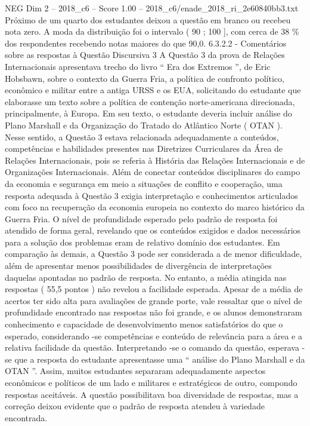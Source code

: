 \begin{textsample}{NEG Dim 2 – 2018\_c6 – Score 1.00 – 2018\_c6/enade\_2018\_ri\_2e60840bb3.txt}
Próximo de um quarto dos estudantes deixou a questão em branco ou recebeu nota zero.
A moda da distribuição foi o intervalo ( 90 ; 100 ], com cerca de 38 \% dos respondentes recebendo notas maiores do que 90,0. 6.3.2.2 - Comentários sobre as respostas à Questão Discursiva 3 A Questão 3 da prova de Relações Internacionais apresentava trecho do livro “ Era dos Extremos ”, de Eric Hobsbawn, sobre o contexto da Guerra Fria, a política de confronto político, econômico e militar entre a antiga URSS e os EUA, solicitando do estudante que elaborasse um texto sobre a política de contenção norte-americana direcionada, principalmente, à Europa.
Em seu texto, o estudante deveria incluir análise do Plano Marshall e da Organização do Tratado do Atlântico Norte ( OTAN ).
Nesse sentido, a Questão 3 estava relacionada adequadamente a conteúdos, competências e habilidades presentes nas Diretrizes Curriculares da Área de Relações Internacionais, pois se referia à História das Relações Internacionais e de Organizações Internacionais.
Além de conectar conteúdos disciplinares do campo da economia e segurança em meio a situações de conflito e cooperação, uma resposta adequada à Questão 3 exigia interpretação e conhecimentos articulados com foco na recuperação da economia europeia no contexto do marco histórico da Guerra Fria.
O nível de profundidade esperado pelo padrão de resposta foi atendido de forma geral, revelando que os conteúdos exigidos e dados necessários para a solução dos problemas eram de relativo domínio dos estudantes.
Em comparação às demais, a Questão 3 pode ser considerada a de menor dificuldade, além de apresentar menos possibilidades de divergência de interpretações daquelas apontadas no padrão de resposta.
No entanto, a média atingida nas respostas ( 55,5 pontos ) não revelou a facilidade esperada.
Apesar de a média de acertos ter sido alta para avaliações de grande porte, vale ressaltar que o nível de profundidade encontrado nas respostas não foi grande, e os alunos demonstraram conhecimento e capacidade de desenvolvimento menos satisfatórios do que o esperado, considerando -se competências e conteúdo de relevância para a área e a relativa facilidade da questão.
Interpretando -se o comando da questão, esperava -se que a resposta do estudante apresentasse uma “ análise do Plano Marshall e da OTAN ”.
Assim, muitos estudantes separaram adequadamente aspectos econômicos e políticos de um lado e militares e estratégicos de outro, compondo respostas aceitáveis.
A questão possibilitava boa diversidade de respostas, mas a correção deixou evidente que o padrão de resposta atendeu à variedade encontrada.

\end{textsample}
